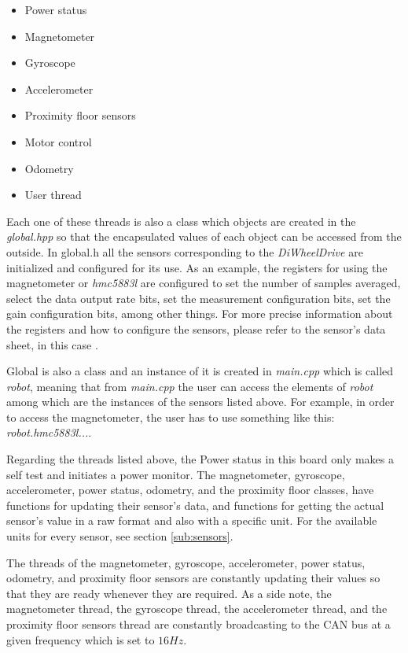 \documentclass[12pt]{report}%
\begin{document}
\begin{itemize}
  \item Power status
  \item Magnetometer
	\item Gyroscope
	\item Accelerometer
	\item Proximity floor sensors
	\item Motor control
	\item Odometry
	\item User thread
\end{itemize}

Each one of these threads is also a class which objects are created in the \textit{global.hpp} so that the encapsulated values of each object can be accessed from the outside. In global.h all the sensors corresponding to the \textit{DiWheelDrive} are initialized and configured for its use. As an example, the registers for using the magnetometer or \textit{hmc5883l} are configured to set the number of samples averaged, select the data output rate bits, set the measurement configuration bits, set the gain configuration bits, among other things. For more precise information about the registers and how to configure the sensors, please refer to the sensor's data sheet, in this case \cite{magnetometerpart}.

Global is also a class and an instance of it is created in \textit{main.cpp} which is called \textit{robot}, meaning that from \textit{main.cpp} the user can access the elements of \textit{robot} among which are the instances of the sensors listed above. For example, in order to access the magnetometer, the user has to use something like this: \textit{robot.hmc5883l...}.

Regarding the threads listed above, the Power status in this board only makes a self test and initiates a power monitor. The magnetometer, gyroscope, accelerometer, power status, odometry, and the proximity floor classes, have functions for updating their sensor's data, and functions for getting the actual sensor's value in a raw format and also with a specific unit. For the available units for every sensor, see section \ref{sub:sensors}.

The threads of the magnetometer, gyroscope, accelerometer, power status, odometry, and proximity floor sensors are constantly updating their values so that they are ready whenever they are required. As a side note, the magnetometer thread, the gyroscope thread, the accelerometer thread, and the proximity floor sensors thread are constantly broadcasting to the CAN bus at a given frequency which is set to $16Hz$.
\end{document}
